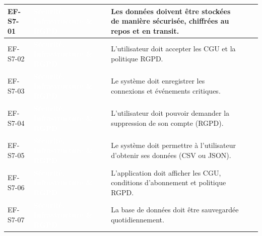 \begin{longtable}{|P{1.75cm}|P{2.65cm}|P{7.45cm}|P{1.80cm}|P{1.55cm}|}
EF-S7-01 & \textcolor{white}{\textbf{Sécurité, Infrastructure \& RGPD}} & Les données doivent être stockées de manière sécurisée, chiffrées au repos et en transit. &  &  \\ \hline
EF-S7-02 & \textcolor{white}{\textbf{Sécurité, Infrastructure \& RGPD}} & L'utilisateur doit accepter les CGU et la politique RGPD. &  &  \\ \hline
EF-S7-03 & \textcolor{white}{\textbf{Sécurité, Infrastructure \& RGPD}} & Le système doit enregistrer les connexions et événements critiques. &  &  \\ \hline
EF-S7-04 & \textcolor{white}{\textbf{Sécurité, Infrastructure \& RGPD}} & L’utilisateur doit pouvoir demander la suppression de son compte (RGPD). &  &  \\ \hline
EF-S7-05 & \textcolor{white}{\textbf{Sécurité, Infrastructure \& RGPD}} & Le système doit permettre à l’utilisateur d’obtenir ses données (CSV ou JSON). &  &  \\ \hline
EF-S7-06 & \textcolor{white}{\textbf{Sécurité, Infrastructure \& RGPD}} & L’application doit afficher les CGU, conditions d’abonnement et politique RGPD. &  &  \\ \hline
EF-S7-07 & \textcolor{white}{\textbf{Sécurité, Infrastructure \& RGPD}} & La base de données doit être sauvegardée quotidiennement. &  &  \\ \hline
\end{longtable}
\endgroup
